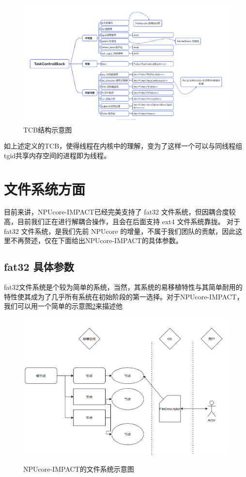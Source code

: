 \begin{figure}[h]
    \centering
    \includegraphics[width=1\linewidth]{figs/TCBBlock.png}
    \caption{TCB结构示意图}
    \label{TCB结构示意图}
\end{figure}

如上述定义的TCB，使得线程在内核中的理解，变为了这样一个可以与同线程组tgid共享内存空间的进程即为线程。

\section{文件系统方面}

目前来讲，NPUcore-IMPACT已经完美支持了 fat32 文件系统，但因耦合度较高，目前我们正在进行解耦合操作，且会在后面支持 ext4 文件系统靠拢。
对于 fat32 文件系统，是我们先前 NPUcore 的增量，不属于我们团队的贡献，因此这里不再赘述，仅在下面给出NPUcore-IMPACT的具体参数。

\subsection{fat32 具体参数}

fat32文件系统是个较为简单的系统，当然，其系统的易移植特性与其简单耐用的特性使其成为了几乎所有系统在初始阶段的第一选择。对于NPUcore-IMPACT，我们可以用一个简单的示意图\ref{fig:fs}来描述他

\begin{figure}[htb]
    \centering
    \includegraphics[width=1\linewidth]{figs/dirt.PNG}
    \label{fig:fs}
    \caption{NPUcore-IMPACT的文件系统示意图}
\end{figure}


